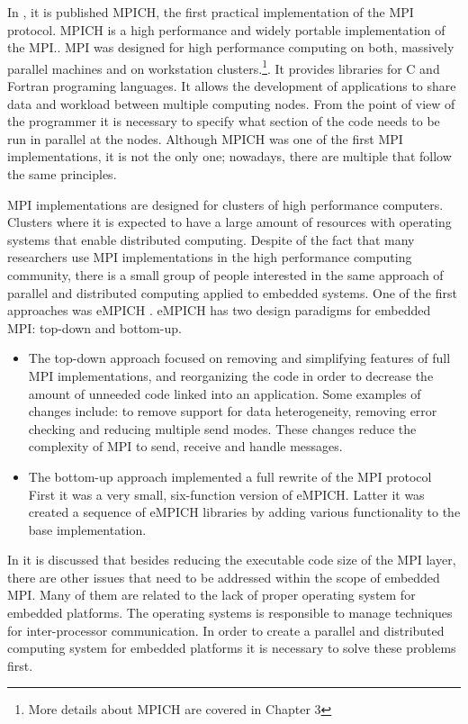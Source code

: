 
In \cite{Salim}, it is published MPICH,  the first practical implementation of
the MPI protocol. MPICH is a high performance and widely portable
implementation of the MPI.\cite{Gropp}. MPI was designed for high performance
computing on both, massively parallel machines and on workstation
clusters.\footnote{More details about MPICH are covered in Chapter 3}. It
provides libraries for C and Fortran programing languages. It allows the
development of applications to share data and workload between multiple
computing nodes. From the point of view of the programmer it is necessary to
specify what section of the code needs to be run in parallel at the nodes.
Although MPICH was one of the first MPI implementations, it is not the only
one; nowadays, there are multiple that follow the same principles.


MPI implementations are designed for clusters of high performance computers.
Clusters where it is expected to have a large amount of resources with
operating systems that enable distributed computing.
Despite of the fact that many researchers use MPI implementations in the high
performance computing community, there is a small group of people interested in
the same approach of parallel and distributed computing applied to embedded
systems. One of the first approaches was eMPICH \cite{McMahon}. eMPICH has two
design paradigms for embedded MPI: top-down and bottom-up.

\begin{itemize} 
\item The top-down approach focused on removing and simplifying
features of full MPI implementations, and reorganizing the code in order to
decrease the amount of unneeded code linked into an application. Some examples
of changes include: to remove support for data heterogeneity, removing error
checking and reducing multiple send modes. These changes reduce the complexity
of MPI to send, receive and handle messages.

\item The bottom-up approach implemented a full rewrite of the MPI protocol
First it was a very small, six-function version of eMPICH. Latter it was
created a sequence of eMPICH libraries by adding various functionality to the
base implementation.  
\end{itemize}

In \cite{McMahon} it is discussed that besides reducing the executable code
size of the MPI layer, there are other issues that need to be addressed within
the scope of embedded MPI. Many of them are related to the lack of proper
operating system for embedded platforms. The operating systems is responsible
to manage techniques for inter-processor communication. In order to create a
parallel and distributed computing system for embedded platforms it is
necessary to solve these problems first.

